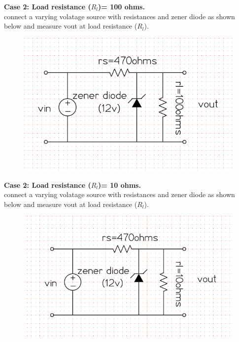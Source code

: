 \documentclass[12pt]{article}
\begin{document}
 \textbf{Case 2: Load resistance (\(R_{l}\))= 100 ohms.\\}
connect a varying volatage source with resistances and zener diode as shown below and measure vout at load resistance (\(R_{l}\)).
 \begin{figure}[h!]
\centering
\includegraphics[scale = 0.4]{zener_100_cir.png}
\end{figure}

\textbf{Case 2: Load resistance (\(R_{l}\))= 10 ohms.\\}
connect a varying volatage source with resistances and zener diode as shown below and measure vout at load resistance (\(R_{l}\)).
 \begin{figure}[h!]
\centering
\includegraphics[scale = 0.4]{zener_10_cir.png}
\end{figure}
\newpage
 
\end{document}
